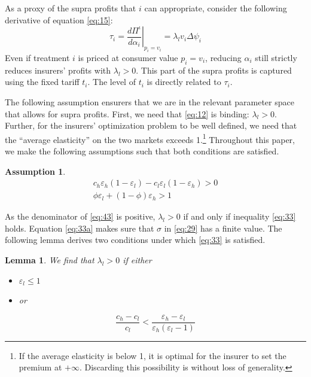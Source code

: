 \documentclass[a4paper,12pt]{article}
\newtheorem{assumption}{Assumption}
\newtheorem{lemma}{Lemma}
\begin{document}
As a proxy of the supra profits that \(i\) can appropriate, consider the following derivative of equation \eqref{eq:15}:
\begin{equation}
\label{eq:1}
\tau_i = \left. \frac{d\Pi^{\iota}}{d\alpha_{i}} \right|_{p_i=v_i} = \lambda_l v_i \Delta \psi_i
\end{equation}
Even if treatment \(i\) is priced at consumer value \(p_i = v_i\), reducing \(\alpha_i\) still strictly reduces insurers' profits with \(\lambda_l > 0\). This part of the supra profits is captured using the fixed tariff \(t_i\). The level of \(t_i\) is directly related to \(\tau_i\).

The following assumption ensurers that we are in the relevant parameter space that allows for supra profits. First, we need that \eqref{eq:12} is binding: \(\lambda_l >0\). Further, for the insurers' optimization problem to be well defined, we need that the ``average elasticity'' on the two markets exceeds 1.\footnote{If the average elasticity is below 1, it is optimal for the insurer to set the premium at \(+\infty\). Discarding this possibility is without loss of generality.} Throughout this paper, we make the following assumptions such that both conditions are satisfied.

\begin{assumption}
\label{Elasticities}
\begin{align}
\label{eq:33}
c_h \varepsilon_h (1- \varepsilon_l )-c_l \varepsilon_l(1-\varepsilon_h) > 0 \\
\label{eq:33a}
\phi \varepsilon_l + (1-\phi) \varepsilon_h > 1
\end{align}
\end{assumption}

As the denominator of \eqref{eq:43} is positive, \(\lambda_l >0\) if and only if inequality \eqref{eq:33} holds. Equation \eqref{eq:33a} makes sure that \(\sigma\) in \eqref{eq:29} has a finite value. The following lemma derives two conditions under which \eqref{eq:33} is satisfied.

\begin{lemma}
\label{IC_l_binding}
We find that \(\lambda_l >0\) if either
\begin{itemize}
\item \(\varepsilon_l \leq 1\)
\item or
\end{itemize}
\begin{equation}
\label{eq:34}
\frac{c_h-c_l}{c_l} < \frac{\varepsilon_h - \varepsilon_l}{\varepsilon_h (\varepsilon_l -1)}
\end{equation}
\end{lemma}
\end{document}
